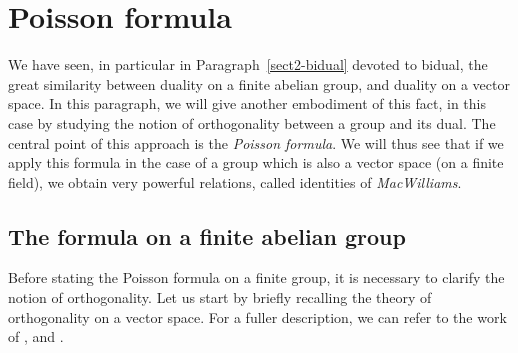 \section{Poisson formula}
\label{sect1-fish-formula} 
 
  We have seen, in particular in Paragraph~\ref{sect2-bidual} devoted to bidual, the great similarity between duality on a finite abelian group, and duality on a vector space. In this paragraph, we will give another embodiment of this fact, in this case by studying the notion of orthogonality between a group and its dual. The central point of this approach is the \textit{Poisson formula}. We will thus see that if we apply this formula in the case of a group which is also a vector space (on a finite field), we obtain very powerful relations, called identities of \textit{MacWilliams}.
\subsection{The formula on a finite abelian group}
\label{abelian-finite-grpe-fish-formula} 
 
 
Before stating the Poisson formula on a finite group, it is necessary to clarify the notion of orthogonality. Let us start by briefly recalling the theory of orthogonality on a vector space. For a fuller description, we can refer to the work of ,  and  \cite{ramis-1}.
 
